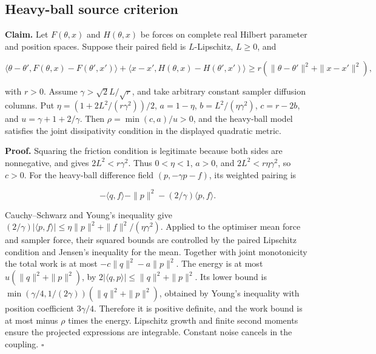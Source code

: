 \documentclass[11pt,a4paper]{report}
\begin{document}
\subsection{\texorpdfstring{Heavy-ball source criterion}{Heavy-ball source criterion}}


\textbf{Claim.} Let \(F(\theta,x)\) and \(H(\theta,x)\) be forces on complete real Hilbert parameter and position spaces. Suppose their paired field is \(L\)-Lipschitz, \(L\ge0\), and

\[\langle\theta-\theta',F(\theta,x)-F(\theta',x')\rangle+\langle x-x',H(\theta,x)-H(\theta',x')\rangle\ge r(\|\theta-\theta'\|^2+\|x-x'\|^2),\]

with \(r>0\). Assume \(\gamma>\sqrt2L/\sqrt r\), and take arbitrary constant sampler diffusion columns. Put \(\eta=(1+2L^2/(r\gamma^2))/2\), \(a=1-\eta\), \(b=L^2/(\eta\gamma^2)\), \(c=r-2b\), and \(u=\gamma+1+2/\gamma\). Then \(\rho=\min(c,a)/u>0\), and the heavy-ball model satisfies the joint dissipativity condition in the displayed quadratic metric.



\textbf{Proof.} Squaring the friction condition is legitimate because both sides are nonnegative, and gives \(2L^2<r\gamma^2\). Thus \(0<\eta<1\), \(a>0\), and \(2L^2<r\eta\gamma^2\), so \(c>0\). For the heavy-ball difference field \((p,-\gamma p-f)\), its weighted pairing is

\[-\langle q,f\rangle-\|p\|^2-(2/\gamma)\langle p,f\rangle.\]

Cauchy–Schwarz and Young's inequality give \((2/\gamma)|\langle p,f\rangle|\le\eta\|p\|^2+\|f\|^2/(\eta\gamma^2)\). Applied to the optimiser mean force and sampler force, their squared bounds are controlled by the paired Lipschitz condition and Jensen's inequality for the mean. Together with joint monotonicity the total work is at most \(-c\|q\|^2-a\|p\|^2\). The energy is at most \(u(\|q\|^2+\|p\|^2)\), by \(2|\langle q,p\rangle|\le\|q\|^2+\|p\|^2\). Its lower bound is \(\min(\gamma/4,1/(2\gamma))(\|q\|^2+\|p\|^2)\), obtained by Young's inequality with position coefficient \(3\gamma/4\). Therefore it is positive definite, and the work bound is at most minus \(\rho\) times the energy. Lipschitz growth and finite second moments ensure the projected expressions are integrable. Constant noise cancels in the coupling. \(\square\)
\end{document}
